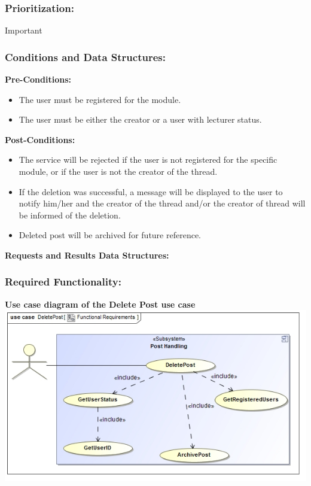 \documentclass[a4paper,11pt]{article}
\begin{document}
\subsubsection{Prioritization:}Important
\subsubsection{Conditions and Data Structures:}
\textbf{Pre-Conditions:}
\begin{itemize}
	\item The user must be registered for the module.
	\item The user must be either the creator or a user with lecturer status.
\end{itemize}
\textbf{Post-Conditions:}
\begin{itemize}
	\item The service will be rejected if the user is not registered for the specific module, or if the user is not the creator of the thread.
	\item If the deletion was successful, a message will be displayed to the user to notify him/her and the creator of the thread and/or the creator of thread will be informed of the deletion.
	\item Deleted post will be archived for future reference.
\end{itemize}
\textbf{Requests and Results Data Structures:}
\subsubsection{Required Functionality:} 
\textbf{Use case diagram of the Delete Post use case}\\
\includegraphics[width=1\linewidth]{./Images/PostHandling/postDeletion.jpg}\\
\end{document}
